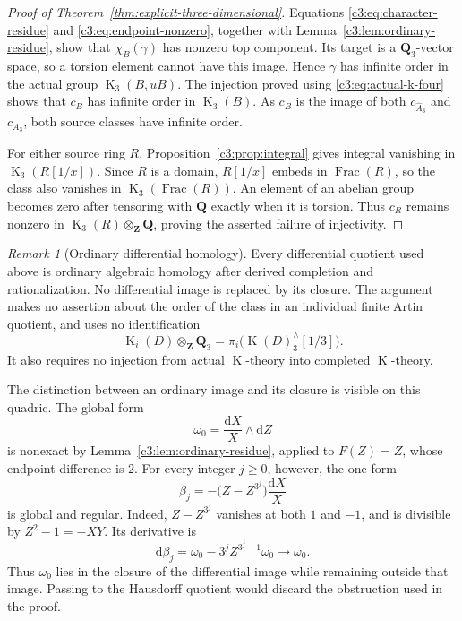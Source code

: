 \documentclass[11pt,a4paper]{amsart}
\numberwithin{equation}{section}
\theoremstyle{definition}
\theoremstyle{remark}
\newtheorem{remark}[theorem]{Remark}
\newcommand{\CthreeZ}{\mathbf{Z}}
\newcommand{\CthreeQ}{\mathbf{Q}}
\newcommand{\Cthreedd}{\mathrm{d}}
\DeclareMathOperator{\CthreeK}{K}
\DeclareMathOperator{\CthreeFrac}{Frac}
\begin{document}
\begin{proof}[Proof of Theorem~\ref{thm:explicit-three-dimensional}]
Equations \eqref{c3:eq:character-residue} and
\eqref{c3:eq:endpoint-nonzero}, together with
Lemma~\ref{c3:lem:ordinary-residue}, show that
$\chi_B(\gamma)$ has nonzero top component.
Its target is a $\CthreeQ_3$-vector space, so a torsion element cannot have
this image.
Hence $\gamma$ has infinite order in the actual group
$\CthreeK_3(B,uB)$.
The injection proved using \eqref{c3:eq:actual-k-four} shows that $c_B$
has infinite order in $\CthreeK_3(B)$.
As $c_B$ is the image of both $c_{\widehat A_3}$ and $c_{A_3}$, both
source classes have infinite order.

For either source ring $R$, Proposition~\ref{c3:prop:integral} gives
integral vanishing in $\CthreeK_3(R[1/x])$.
Since $R$ is a domain, $R[1/x]$ embeds in $\CthreeFrac(R)$, so the class
also vanishes in $\CthreeK_3(\CthreeFrac(R))$.
An element of an abelian group becomes zero after tensoring with
$\CthreeQ$ exactly when it is torsion.
Thus $c_R$ remains nonzero in $\CthreeK_3(R)\otimes_{\CthreeZ}\CthreeQ$, proving the
asserted failure of injectivity.
\end{proof}

\begin{remark}[Ordinary differential homology]
\label{c3:rem:ordinary-homology}
Every differential quotient used above is ordinary algebraic homology
after derived completion and rationalization.
No differential image is replaced by its closure.
The argument makes no assertion about the order of the class in an
individual finite Artin quotient, and uses no identification
\[
 \CthreeK_i(D)\otimes_{\CthreeZ}\CthreeQ_3
   =\pi_i\bigl(\CthreeK(D)^\wedge_3[1/3]\bigr).
\]
It also requires no injection from actual $\CthreeK$-theory into completed
$\CthreeK$-theory.

The distinction between an ordinary image and its closure is visible
on this quadric.
The global form
\[
 \omega_0=\frac{\Cthreedd X}{X}\wedge\Cthreedd Z
\]
is nonexact by Lemma~\ref{c3:lem:ordinary-residue}, applied to $F(Z)=Z$,
whose endpoint difference is $2$.
For every integer $j\geq0$, however, the one-form
\[
 \beta_j=-\bigl(Z-Z^{3^j}\bigr)\frac{\Cthreedd X}{X}
\]
is global and regular.
Indeed, $Z-Z^{3^j}$ vanishes at both $1$ and $-1$, and is divisible
by $Z^2-1=-XY$.
Its derivative is
\[
 \Cthreedd\beta_j
    =\omega_0-3^jZ^{3^j-1}\omega_0
    \longrightarrow\omega_0.
\]
Thus $\omega_0$ lies in the closure of the differential image while
remaining outside that image.
Passing to the Hausdorff quotient would discard the obstruction used
in the proof.
\end{remark}
\end{document}
